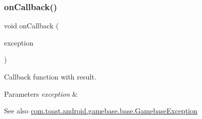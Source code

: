 \subsubsection{\texorpdfstring{on\+Callback()}{onCallback()}}
{\footnotesize\ttfamily void on\+Callback (\begin{DoxyParamCaption}\item[{\hyperlink{classcom_1_1toast_1_1android_1_1gamebase_1_1base_1_1_gamebase_exception}{Gamebase\+Exception}}]{exception }\end{DoxyParamCaption})}



Callback function with result. 


\begin{DoxyParams}{Parameters}
{\em exception} & \\
\hline
\end{DoxyParams}
\begin{DoxySeeAlso}{See also}
\hyperlink{classcom_1_1toast_1_1android_1_1gamebase_1_1base_1_1_gamebase_exception}{com.\+toast.\+android.\+gamebase.\+base.\+Gamebase\+Exception} 
\end{DoxySeeAlso}
